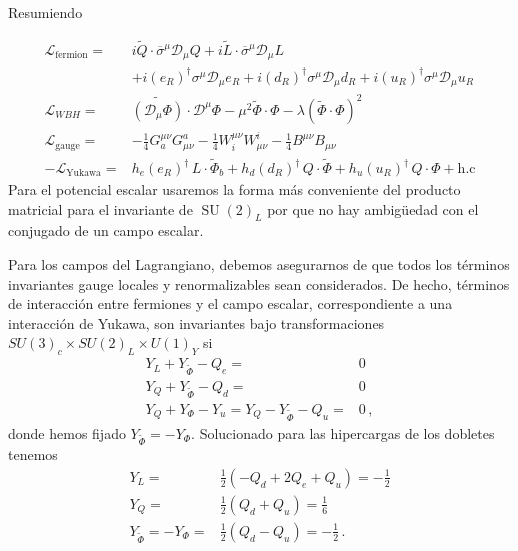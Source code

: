 \begin{frame}
Resumiendo

\begin{align}
  \label{eq:smscalar}
\mathcal{L}_{\text{fermion}}=&i\widetilde{Q}\cdot \overline{\sigma}^\mu\mathcal{D}_\mu Q+i\widetilde{L}\cdot \overline{\sigma}^\mu\mathcal{D}_\mu L \nonumber\\
&+i(e_R)^{\dagger}\sigma^\mu\mathcal{D}_\mu {e_R}+i(d_R)^{\dagger}\sigma^\mu\mathcal{D}_\mu {d_R}+i(u_R)^{\dagger}\sigma^\mu\mathcal{D}_\mu {u_R}\nonumber\\
  \mathcal{L}_{WBH}=&\widetilde{\left( \mathcal{D}_\mu{\Phi} \right)}\cdot\mathcal{D}^\mu\Phi-\mu^2\widetilde{\Phi}\cdot\Phi-\lambda \left( \widetilde{\Phi}\cdot\Phi \right)^2 \nonumber\\
\mathcal{L}_{\text{gauge}}=& -\tfrac{1}{4}G^{\mu\nu}_a G_{\mu\nu}^a-\tfrac{1}{4}W^{\mu\nu}_i W_{\mu\nu}^i-\tfrac{1}{4}B^{\mu\nu} B_{\mu\nu}\nonumber\\
-\mathcal{L}_{\text{Yukawa}}=&  h_e \left( e_R \right)^{\dagger}\,L\cdot \widetilde{\Phi}_b +
      h_d \left( d_R \right)^{\dagger}\,Q\cdot \widetilde{\Phi} +
      h_u \left( u_R \right)^{\dagger}\,Q\cdot {\Phi}+\text{h.c}
\end{align}
Para el potencial escalar usaremos la forma más conveniente del producto matricial para el invariante de $\operatorname{SU}(2)_L$ por que no hay ambigüedad con el conjugado de un campo escalar.

Para los campos del Lagrangiano, debemos asegurarnos de que todos los términos invariantes gauge locales y renormalizables sean considerados. De hecho, términos de interacción entre fermiones y el campo escalar, correspondiente a una interacción de Yukawa, son invariantes bajo transformaciones $SU(3)_c\times  SU(2)_L\times  U(1)_Y$ si
\begin{align*}
  Y_L+Y_{\widetilde{\Phi}}-Q_{e}=&0\\
  Y_Q+Y_{\widetilde{\Phi}}-Q_{d}=&0\\
  Y_Q+Y_{\Phi}-Y_{u}=Y_Q-Y_{\widetilde{\Phi}}-Q_{u}=&0\,,
\end{align*}
donde hemos fijado $Y_{\widetilde{\Phi}}=-Y_\Phi$. Solucionado para las hipercargas de los dobletes tenemos
\begin{align}
\label{eq:yyy}
Y_L=&\frac{1}{2}\left( -Q_d+2Q_e+Q_u \right)=-\frac{1}{2}  \nonumber\\
Y_Q=&\frac{1}{2}\left( Q_d+Q_u \right)=\frac{1}{6} \nonumber\\
Y_{\widetilde{\Phi}}=-Y_{\Phi}=&\frac{1}{2}\left( Q_d-Q_u \right)=-\frac{1}{2}\,.
\end{align}


\end{frame}
